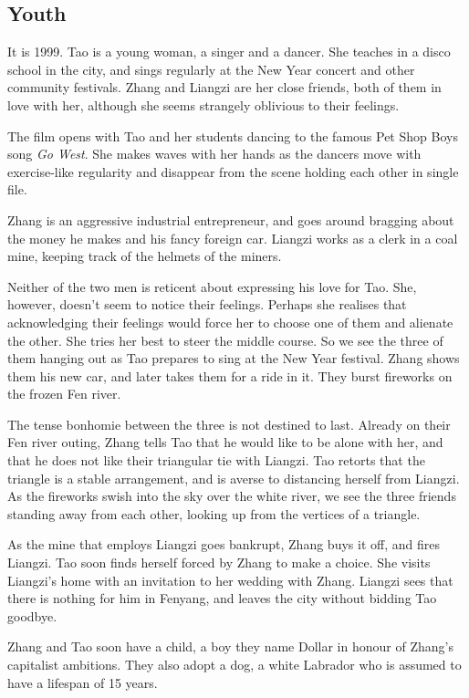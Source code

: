 \documentclass{article}
\begin{document}
\subsection{Youth}
\label{sec:jfdg3q3z}

It is 1999.  Tao is a young woman, a singer and a dancer.  She teaches
in a disco school in the city, and sings regularly at the New Year
concert and other community festivals.  Zhang and Liangzi are her
close friends, both of them in love with her, although she seems
strangely oblivious to their feelings.

The film opens with Tao and her students dancing to the famous Pet
Shop Boys song \emph{Go West}.  She makes waves with her hands as the
dancers move with exercise-like regularity and disappear from the
scene holding each other in single file.

Zhang is an aggressive industrial entrepreneur, and goes around
bragging about the money he makes and his fancy foreign car.  Liangzi
works as a clerk in a coal mine, keeping track of the helmets of the
miners.

Neither of the two men is reticent about expressing his love for Tao.
She, however, doesn't seem to notice their feelings.  Perhaps she
realises that acknowledging their feelings would force her to choose
one of them and alienate the other.  She tries her best to steer the
middle course.  So we see the three of them hanging out as Tao
prepares to sing at the New Year festival.  Zhang shows them his new
car, and later takes them for a ride in it.  They burst fireworks on
the frozen Fen river.

The tense bonhomie between the three is not destined to last.  Already
on their Fen river outing, Zhang tells Tao that he would like to be
alone with her, and that he does not like their triangular tie with
Liangzi.  Tao retorts that the triangle is a stable arrangement, and
is averse to distancing herself from Liangzi.  As the fireworks swish
into the sky over the white river, we see the three friends standing
away from each other, looking up from the vertices of a triangle.

As the mine that employs Liangzi goes bankrupt, Zhang buys it off, and
fires Liangzi.  Tao soon finds herself forced by Zhang to make a
choice.  She visits Liangzi's home with an invitation to her wedding
with Zhang.  Liangzi sees that there is nothing for him in Fenyang,
and leaves the city without bidding Tao goodbye.

Zhang and Tao soon have a child, a boy they name Dollar in honour of
Zhang's capitalist ambitions.  They also adopt a dog, a white Labrador
who is assumed to have a lifespan of 15 years.
\end{document}
